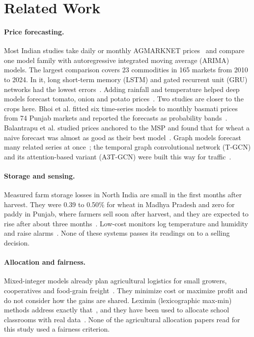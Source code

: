 \section{Related Work}
\label{sec:related}

\paragraph{Price forecasting.} Most Indian studies take daily or monthly AGMARKNET prices~\cite{agmarknet} and compare one model family
with autoregressive integrated moving average (ARIMA) models. The largest comparison covers 23 commodities in 165 markets from 2010 to
2024. In it, long short-term memory (LSTM) and gated recurrent unit (GRU) networks had the lowest errors~\cite{manogna}. Adding rainfall
and temperature helped deep models forecast tomato, onion and potato prices~\cite{nayak}. Two studies are closer to the crops here. Bhoi
et al. fitted six time-series models to monthly basmati prices from 74 Punjab markets and reported the forecasts as probability
bands~\cite{bhoi2023}. Balantrapu et al. studied prices anchored to the MSP and found that for wheat a naive forecast was almost as good
as their best model~\cite{balantrapu2026}. Graph models forecast many related series at once~\cite{ozden}\cite{min}; the temporal graph
convolutional network (T-GCN) and its attention-based variant (A3T-GCN) were built this way for traffic~\cite{zhao}\cite{bai}.

\paragraph{Storage and sensing.} Measured farm storage losses in North India are small in the first months after harvest. They were
0.39 to 0.50\% for wheat in Madhya Pradesh and zero for paddy in Punjab, where farmers sell soon after harvest, and they are expected to
rise after about three months~\cite{gulati2024report}. Low-cost monitors log temperature and humidity and raise alarms~\cite{islam}.
None of these systems passes its readings on to a selling decision.

\paragraph{Allocation and fairness.} Mixed-integer models already plan agricultural logistics for small growers, cooperatives and
food-grain freight~\cite{urra}\cite{anoop}. They minimize cost or maximize profit and do not consider how the gains are shared.
Leximin (lexicographic max-min) methods address exactly that~\cite{ogryczak2014}\cite{chen2023fairness}, and they have been used to
allocate school classrooms with real data~\cite{kurokawa2018}. None of the agricultural allocation papers read for this study used a
fairness criterion.

